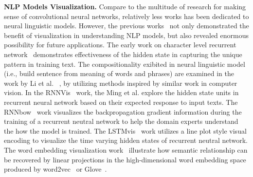 \textbf{NLP Models Visualization.}
Compare to the multitude of research for making sense of convolutional neural networks, relatively less works has been dedicated to neural linguistic models.
%
However, the previous works~\cite{KarpathyJohnson2015, LiChenHovy2015, StrobeltGehrmannPfister2018, LiuBremerJayaraman2018} not only demonstrated the benefit of visualization in understanding NLP models, but also revealed enormous possibility for future applications.
The early work on character level recurrent network~\cite{KarpathyJohnson2015} demonstrates effectiveness of the hidden state in capturing the unique pattern in training text. The compositionality exibited in neural linguistic model (i.e., build sentence from meaning of words and phrases) are examined in the work by Li et al. ~\cite{LiChenHovy2015}, by utilizing methods inspired by similar work in computer vision.
In the RNNVis~\cite{MingCaoZhang2017} work, the Ming et al. explore the  hidden state units in recurrent neural network based on their expected response to input texts.
The RNNbow~\cite{CashmanPattersonMosca2017} work visualizes the backpropagation gradient information during the training of a recurrent neutral network to help the domain experts understand the how the model is trained.
The LSTMvis~\cite{StrobeltGehrmannPfister2018} work utilizes a line plot style visual encoding to visualize the time varying hidden states of recurrent neutral network. The word embedding visualization work~\cite{LiuBremerJayaraman2018} illustrate how semantic relationship can be recovered by linear projections in the high-dimensional word embedding space produced by word2vec~\cite{MikolovSutskeverChen2013} or Glove~\cite{PenningtonSocherManning2014}.
